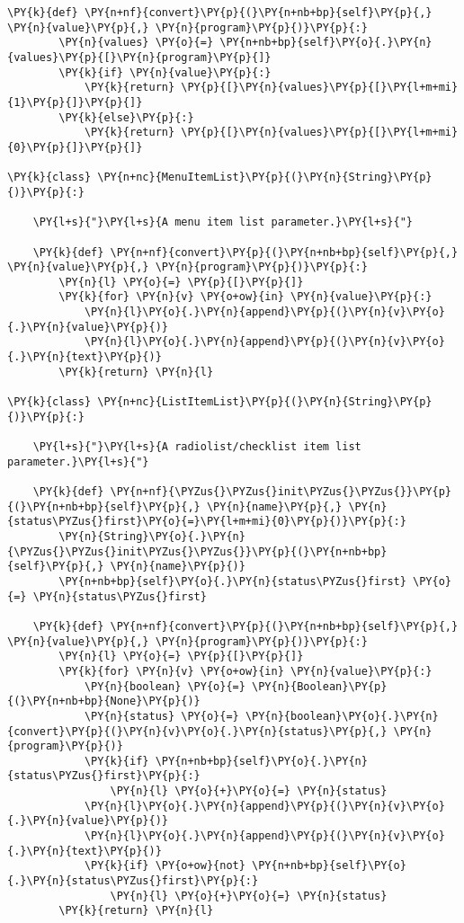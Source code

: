 \begin{Verbatim}[commandchars=\\\{\}]
    \PY{k}{def} \PY{n+nf}{convert}\PY{p}{(}\PY{n+nb+bp}{self}\PY{p}{,} \PY{n}{value}\PY{p}{,} \PY{n}{program}\PY{p}{)}\PY{p}{:}
        \PY{n}{values} \PY{o}{=} \PY{n+nb+bp}{self}\PY{o}{.}\PY{n}{values}\PY{p}{[}\PY{n}{program}\PY{p}{]}
        \PY{k}{if} \PY{n}{value}\PY{p}{:}
            \PY{k}{return} \PY{p}{[}\PY{n}{values}\PY{p}{[}\PY{l+m+mi}{1}\PY{p}{]}\PY{p}{]}
        \PY{k}{else}\PY{p}{:}
            \PY{k}{return} \PY{p}{[}\PY{n}{values}\PY{p}{[}\PY{l+m+mi}{0}\PY{p}{]}\PY{p}{]}

\PY{k}{class} \PY{n+nc}{MenuItemList}\PY{p}{(}\PY{n}{String}\PY{p}{)}\PY{p}{:}

    \PY{l+s}{"}\PY{l+s}{A menu item list parameter.}\PY{l+s}{"}

    \PY{k}{def} \PY{n+nf}{convert}\PY{p}{(}\PY{n+nb+bp}{self}\PY{p}{,} \PY{n}{value}\PY{p}{,} \PY{n}{program}\PY{p}{)}\PY{p}{:}
        \PY{n}{l} \PY{o}{=} \PY{p}{[}\PY{p}{]}
        \PY{k}{for} \PY{n}{v} \PY{o+ow}{in} \PY{n}{value}\PY{p}{:}
            \PY{n}{l}\PY{o}{.}\PY{n}{append}\PY{p}{(}\PY{n}{v}\PY{o}{.}\PY{n}{value}\PY{p}{)}
            \PY{n}{l}\PY{o}{.}\PY{n}{append}\PY{p}{(}\PY{n}{v}\PY{o}{.}\PY{n}{text}\PY{p}{)}
        \PY{k}{return} \PY{n}{l}

\PY{k}{class} \PY{n+nc}{ListItemList}\PY{p}{(}\PY{n}{String}\PY{p}{)}\PY{p}{:}

    \PY{l+s}{"}\PY{l+s}{A radiolist/checklist item list parameter.}\PY{l+s}{"}

    \PY{k}{def} \PY{n+nf}{\PYZus{}\PYZus{}init\PYZus{}\PYZus{}}\PY{p}{(}\PY{n+nb+bp}{self}\PY{p}{,} \PY{n}{name}\PY{p}{,} \PY{n}{status\PYZus{}first}\PY{o}{=}\PY{l+m+mi}{0}\PY{p}{)}\PY{p}{:}
        \PY{n}{String}\PY{o}{.}\PY{n}{\PYZus{}\PYZus{}init\PYZus{}\PYZus{}}\PY{p}{(}\PY{n+nb+bp}{self}\PY{p}{,} \PY{n}{name}\PY{p}{)}
        \PY{n+nb+bp}{self}\PY{o}{.}\PY{n}{status\PYZus{}first} \PY{o}{=} \PY{n}{status\PYZus{}first}

    \PY{k}{def} \PY{n+nf}{convert}\PY{p}{(}\PY{n+nb+bp}{self}\PY{p}{,} \PY{n}{value}\PY{p}{,} \PY{n}{program}\PY{p}{)}\PY{p}{:}
        \PY{n}{l} \PY{o}{=} \PY{p}{[}\PY{p}{]}
        \PY{k}{for} \PY{n}{v} \PY{o+ow}{in} \PY{n}{value}\PY{p}{:}
            \PY{n}{boolean} \PY{o}{=} \PY{n}{Boolean}\PY{p}{(}\PY{n+nb+bp}{None}\PY{p}{)}
            \PY{n}{status} \PY{o}{=} \PY{n}{boolean}\PY{o}{.}\PY{n}{convert}\PY{p}{(}\PY{n}{v}\PY{o}{.}\PY{n}{status}\PY{p}{,} \PY{n}{program}\PY{p}{)}
            \PY{k}{if} \PY{n+nb+bp}{self}\PY{o}{.}\PY{n}{status\PYZus{}first}\PY{p}{:}
                \PY{n}{l} \PY{o}{+}\PY{o}{=} \PY{n}{status}
            \PY{n}{l}\PY{o}{.}\PY{n}{append}\PY{p}{(}\PY{n}{v}\PY{o}{.}\PY{n}{value}\PY{p}{)}
            \PY{n}{l}\PY{o}{.}\PY{n}{append}\PY{p}{(}\PY{n}{v}\PY{o}{.}\PY{n}{text}\PY{p}{)}
            \PY{k}{if} \PY{o+ow}{not} \PY{n+nb+bp}{self}\PY{o}{.}\PY{n}{status\PYZus{}first}\PY{p}{:}
                \PY{n}{l} \PY{o}{+}\PY{o}{=} \PY{n}{status}
        \PY{k}{return} \PY{n}{l}


\end{Verbatim}

